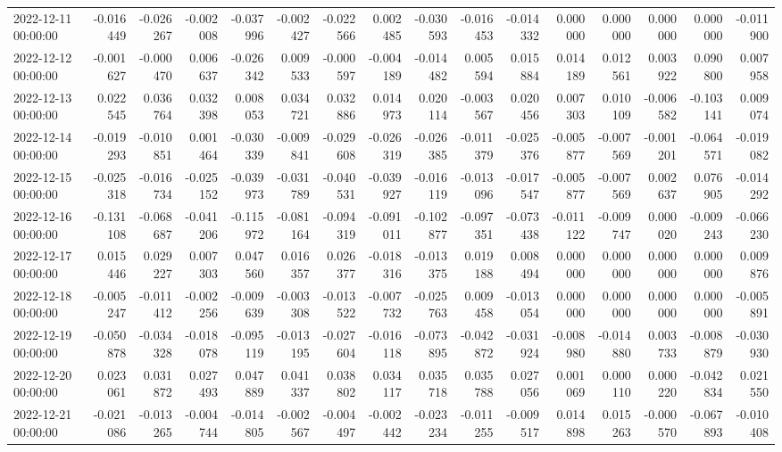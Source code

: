 \begin{tabular}{lrrrrrrrrrrrrrrr}
2022-12-11 00:00:00 & -0.016449 & -0.026267 & -0.002008 & -0.037996 & -0.002427 & -0.022566 & 0.002485 & -0.030593 & -0.016453 & -0.014332 & 0.000000 & 0.000000 & 0.000000 & 0.000000 & -0.011900 \\
2022-12-12 00:00:00 & -0.001627 & -0.000470 & 0.006637 & -0.026342 & 0.009533 & -0.000597 & -0.004189 & -0.014482 & 0.005594 & 0.015884 & 0.014189 & 0.012561 & 0.003922 & 0.090800 & 0.007958 \\
2022-12-13 00:00:00 & 0.022545 & 0.036764 & 0.032398 & 0.008053 & 0.034721 & 0.032886 & 0.014973 & 0.020114 & -0.003567 & 0.020456 & 0.007303 & 0.010109 & -0.006582 & -0.103141 & 0.009074 \\
2022-12-14 00:00:00 & -0.019293 & -0.010851 & 0.001464 & -0.030339 & -0.009841 & -0.029608 & -0.026319 & -0.026385 & -0.011379 & -0.025376 & -0.005877 & -0.007569 & -0.001201 & -0.064571 & -0.019082 \\
2022-12-15 00:00:00 & -0.025318 & -0.016734 & -0.025152 & -0.039973 & -0.031789 & -0.040531 & -0.039927 & -0.016119 & -0.013096 & -0.017547 & -0.005877 & -0.007569 & 0.002637 & 0.076905 & -0.014292 \\
2022-12-16 00:00:00 & -0.131108 & -0.068687 & -0.041206 & -0.115972 & -0.081164 & -0.094319 & -0.091011 & -0.102877 & -0.097351 & -0.073438 & -0.011122 & -0.009747 & 0.000020 & -0.009243 & -0.066230 \\
2022-12-17 00:00:00 & 0.015446 & 0.029227 & 0.007303 & 0.047560 & 0.016357 & 0.026377 & -0.018316 & -0.013375 & 0.019188 & 0.008494 & 0.000000 & 0.000000 & 0.000000 & 0.000000 & 0.009876 \\
2022-12-18 00:00:00 & -0.005247 & -0.011412 & -0.002256 & -0.009639 & -0.003308 & -0.013522 & -0.007732 & -0.025763 & 0.009458 & -0.013054 & 0.000000 & 0.000000 & 0.000000 & 0.000000 & -0.005891 \\
2022-12-19 00:00:00 & -0.050878 & -0.034328 & -0.018078 & -0.095119 & -0.013195 & -0.027604 & -0.016118 & -0.073895 & -0.042872 & -0.031924 & -0.008980 & -0.014880 & 0.003733 & -0.008879 & -0.030930 \\
2022-12-20 00:00:00 & 0.023061 & 0.031872 & 0.027493 & 0.047889 & 0.041337 & 0.038802 & 0.034117 & 0.035718 & 0.035788 & 0.027056 & 0.001069 & 0.000110 & 0.000220 & -0.042834 & 0.021550 \\
2022-12-21 00:00:00 & -0.021086 & -0.013265 & -0.004744 & -0.014805 & -0.002567 & -0.004497 & -0.002442 & -0.023234 & -0.011255 & -0.009517 & 0.014898 & 0.015263 & -0.000570 & -0.067893 & -0.010408 \\

\end{tabular}
